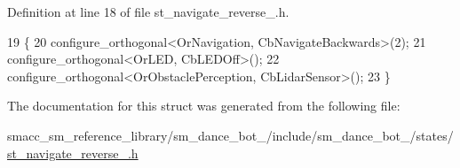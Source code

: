 Definition at line 18 of file st\+\_\+navigate\+\_\+reverse\+\_.\+h.


\begin{DoxyCode}
19    \{
20       configure\_orthogonal<OrNavigation, CbNavigateBackwards>(2);
21       configure\_orthogonal<OrLED, CbLEDOff>();
22       configure\_orthogonal<OrObstaclePerception, CbLidarSensor>();
23    \}
\end{DoxyCode}


The documentation for this struct was generated from the following file\+:\begin{DoxyCompactItemize}
\item 
smacc\+\_\+sm\+\_\+reference\+\_\+library/sm\+\_\+dance\+\_\+bot\+\_/include/sm\+\_\+dance\+\_\+bot\+\_/states/\hyperlink{3_2include_2sm__dance__bot__3_2states_2st__navigate__reverse__1_8h}{st\+\_\+navigate\+\_\+reverse\+\_.\+h}\end{DoxyCompactItemize}
